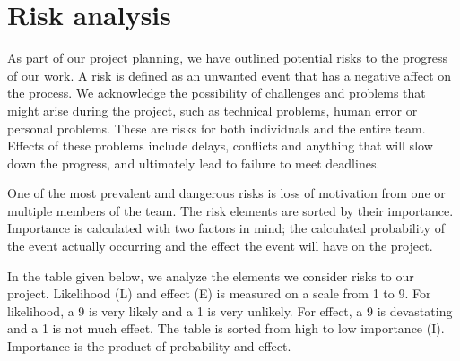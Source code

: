 \section{Risk analysis}
As part of our project planning, we have outlined potential risks to the progress of our work. A risk is defined as an unwanted event that has a negative affect on the process. We acknowledge the possibility of challenges and problems that might arise during the project, such as technical problems, human error or personal problems. These are risks for both individuals and the entire team. Effects of these problems include delays, conflicts and anything that will slow down the progress, and ultimately lead to failure to  meet deadlines. 

One of the most prevalent and dangerous risks is loss of motivation from one or multiple members of the team. The risk elements are sorted by their importance. Importance is calculated with two factors in mind; the calculated probability of the event actually occurring and the effect the event will have on the project. 

In the table given below, we analyze the elements we consider risks to our project. Likelihood (L) and effect (E) is measured on a scale from 1 to 9. For likelihood, a 9 is very likely and a 1 is very unlikely. For effect, a 9 is devastating and a 1 is not much effect. The table is sorted from high to low importance (I). Importance is the product of probability and effect. 



